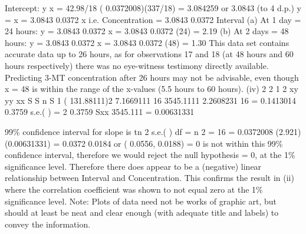 \documentclass[a4paper,12pt]{article}
\begin{document}
Intercept:
y x
= 42.98/18 ( 0.0372008)(337/18)
= 3.084259 or 3.0843 (to 4 d.p.)
y = x
= 3.0843 0.0372 x
i.e. Concentration = 3.0843 0.0372 Interval
(a) At 1 day = 24 hours:
y = 3.0843 0.0372 x
= 3.0843 0.0372 (24)
= 2.19
(b) At 2 days = 48 hours:
y = 3.0843 0.0372 x
= 3.0843 0.0372 (48)
= 1.30
This data set contains accurate data up to 26 hours, as for observations 17 and 18 (at 48 hours and 60 hours respectively) there was no eye-witness testimony directly available. Predicting 3-MT concentration after 26 hours may not be
advisable, even though x = 48 is within the range of the x-values (5.5 hours to 60 hours).
(iv)
2
2 1
2
xy
yy
xx
S
S
n S
1 ( 131.88111)2
7.1669111
16 3545.1111
2.2608231
16
= 0.1413014
0.3759
s.e.( ) =
2 0.3759
Sxx 3545.111
= 0.00631331

99\% confidence interval for slope is tn 2 s.e.( ) df = n 2 = 16
= 0.0372008 (2.921) (0.00631331)
= 0.0372 0.0184
or ( 0.0556, 0.0188)
= 0 is not within this 99\% confidence interval, therefore we would reject the
null hypothesis = 0, at the 1\% significance level.
Therefore there does appear to be a (negative) linear relationship between
Interval and Concentration.
This confirms the result in (ii) where the correlation coefficient was shown to
not equal zero at the 1\% significance level.
Note: Plots of data need not be works of graphic art, but should at least be neat and clear
enough (with adequate title and labels) to convey the information.
\end{document}
